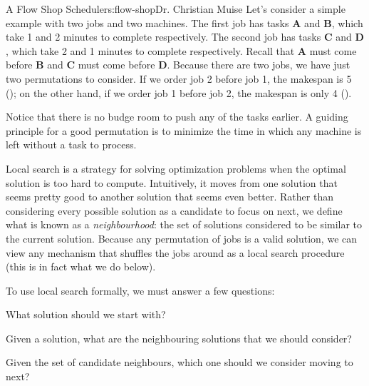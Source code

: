 \begin{aosachapter}{A Flow Shop Scheduler}{s:flow-shop}{Dr. Christian Muise}
Let's consider a simple example with two jobs and two machines. The
first job has tasks $\mathbf{A}$ and $\mathbf{B}$, which take 1 and 2
minutes to complete respectively. The second job has tasks $\mathbf{C}$
and $\mathbf{D}$, which take 2 and 1 minutes to complete respectively.
Recall that $\mathbf{A}$ must come before $\mathbf{B}$ and $\mathbf{C}$
must come before $\mathbf{D}$. Because there are two jobs, we have just
two permutations to consider. If we order job 2 before job 1, the
makespan is 5 (); on the other hand,
if we order job 1 before job 2, the makespan is only 4
().



Notice that there is no budge room to push any of the tasks earlier. A
guiding principle for a good permutation is to minimize the time in
which any machine is left without a task to process.

\label{local-search}

Local search is a strategy for solving optimization problems when the
optimal solution is too hard to compute. Intuitively, it moves from one
solution that seems pretty good to another solution that seems even
better. Rather than considering every possible solution as a candidate
to focus on next, we define what is known as a \emph{neighbourhood}: the
set of solutions considered to be similar to the current solution.
Because any permutation of jobs is a valid solution, we can view any
mechanism that shuffles the jobs around as a local search procedure
(this is in fact what we do below).

To use local search formally, we must answer a few questions:

\begin{aosaenumerate}
\def\labelenumi{\arabic{enumi}.}

\item
  What solution should we start with?
\item
  Given a solution, what are the neighbouring solutions that we should
  consider?
\item
  Given the set of candidate neighbours, which one should we consider
  moving to next?
\end{aosaenumerate}


\end{aosachapter}
